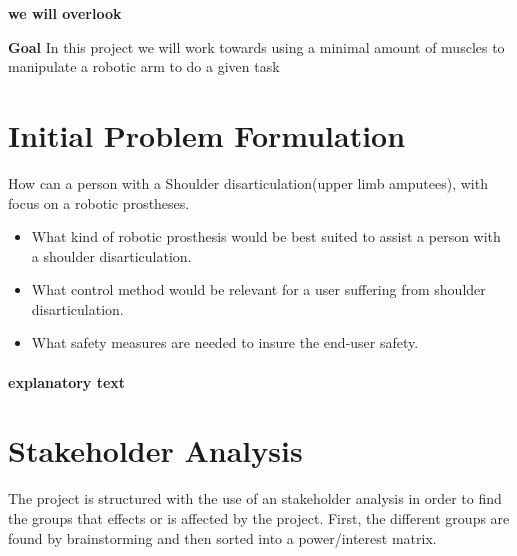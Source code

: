 \textbf{we will overlook}

\textbf{Goal}
In this project we will work towards using a minimal amount of muscles to manipulate a robotic arm to do a given task

    
    
    
\section{Initial Problem Formulation}

How can a person with a Shoulder disarticulation(upper limb amputees), with focus on a robotic prostheses.
\begin{itemize}
    \item What kind of robotic prosthesis would be best suited to assist a person with a shoulder disarticulation.
    \item What control method would be relevant for a user suffering from shoulder disarticulation.
    \item What safety measures are needed to insure the end-user safety.
\end{itemize}
\paragraph{explanatory text}


\section{Stakeholder Analysis}
The project is structured with the use of an stakeholder analysis in order to find the groups that effects or is affected by the project.
First, the different groups are found by brainstorming and then sorted into a power/interest matrix. \\
